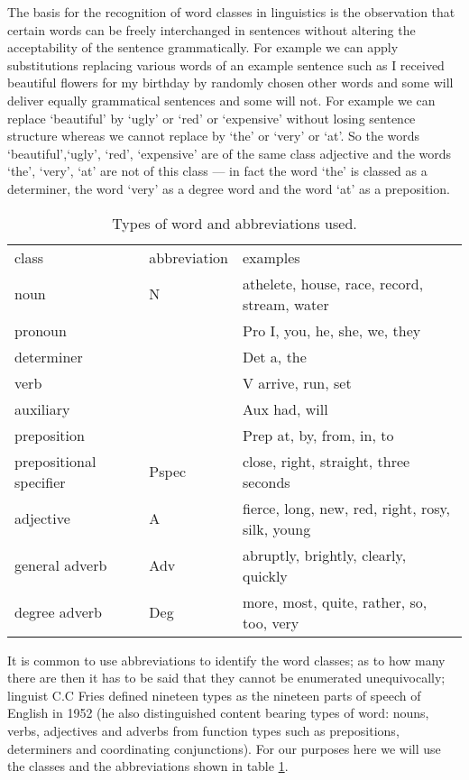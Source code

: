 The basis for the recognition of word classes in linguistics is the observation that certain words can be freely interchanged in sentences without altering the acceptability of the sentence grammatically. For example we can apply substitutions replacing various words of an example sentence such as I received beautiful flowers for my birthday by randomly chosen other words and some will deliver equally grammatical sentences and some will not. For example we can replace ‘beautiful’ by ‘ugly’ or ‘red’ or ‘expensive’ without losing sentence structure whereas we cannot replace by ‘the’ or ‘very’ or ‘at’. So the words ‘beautiful’,‘ugly’, ‘red’, ‘expensive’ are of the same class adjective and the words ‘the’, ‘very’, ‘at’ are not of this class — in fact the word ‘the’ is classed as a determiner, the word ‘very’ as a degree word and the word ‘at’ as a preposition.
\begin{table}
\begin{tabular}{ l l l}
class&	abbreviation &	examples \\
noun&	N	&athelete, house, race, record, stream, water  \\
pronoun&	&Pro	I, you, he, she, we, they  \\
determiner&	&Det	a, the  \\
verb&	    & V	arrive, run, set  \\
auxiliary&	& Aux	had, will  \\
preposition&	&Prep	at, by, from, in, to  \\
prepositional specifier &	Pspec	& close, right, straight, three seconds  \\
adjective	   & A	    &fierce, long, new, red, right, rosy, silk, young  \\
general adverb &	Adv	&abruptly, brightly, clearly, quickly  \\
degree adverb&	Deg	    &more, most, quite, rather, so, too, very  \\
\end{tabular}
\caption{Types of word and abbreviations used.}
\label{wordclassestable}
\end{table}


It is common to use abbreviations to identify the word classes; as to how many there are then it has to be said that they cannot be enumerated unequivocally; linguist C.C Fries defined nineteen types as the nineteen parts of speech of English in 1952 (he also distinguished content bearing types of word: nouns, verbs, adjectives and adverbs from function types such as prepositions, determiners and coordinating conjunctions). For our purposes here we will use the classes and the abbreviations shown in table \ref{wordclassestable}.

